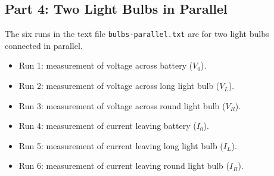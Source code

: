 \subsection{Part 4: Two Light Bulbs in Parallel}
%
The six runs in the text file \texttt{bulbs-parallel.txt} are for two light bulbs connected in parallel.
\begin{itemize}
	\item Run 1: measurement of voltage across battery ($V_{0}$).
	\item Run 2: measurement of voltage across long light bulb ($V_{L}$).
	\item Run 3: measurement of voltage across round light bulb ($V_{R}$).
	\item Run 4: measurement of current leaving battery ($I_{0}$).
	\item Run 5: measurement of current leaving long light bulb ($I_{L}$).
	\item Run 6: measurement of current leaving round light bulb ($I_{R}$).
\end{itemize}
%
